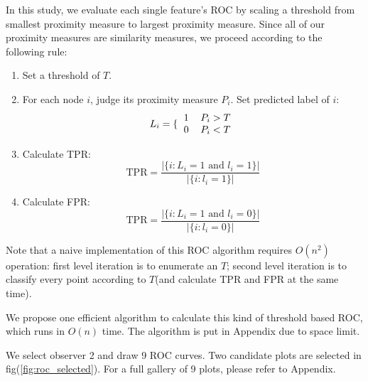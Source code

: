 \documentclass[11pt,a4paper]{article}
\begin{document}
In this study, we evaluate each single feature's ROC by scaling 
a threshold from smallest proximity measure to largest proximity 
measure. Since all of our proximity measures are similarity 
measures, we proceed according to the following rule:
\begin{enumerate}
	\item Set a threshold of $T$. 
	\item For each node $i$, judge its proximity measure $P_i$. 
	Set predicted label of $i$:
	\begin{equation}
		L_i = \lbrace{
			\begin{tabular}{cc}
				$1$ & $P_i > T$ \\
				$0$ & $P_i < T$ 
			\end{tabular}		
		}
	\end{equation}
	\item Calculate TPR:
	\begin{equation}
		\text{TPR} = \frac{|\{i:L_i=1 \text{ and } l_i=1\}|}{|\{i:l_i=1\}|}
	\end{equation}
	\item Calculate FPR:
	\begin{equation}
		\text{TPR} = \frac{|\{i:L_i=1 \text{ and } l_i=0\}|}{|\{i:l_i=0\}|}
	\end{equation}
\end{enumerate}

Note that a naive implementation of this ROC algorithm requires 
$O(n^2)$ operation: first level iteration is to enumerate an $T$;
second level iteration is to classify every point according to 
$T$(and calculate TPR and FPR at the same time).

We propose one efficient algorithm to calculate this kind of 
threshold based ROC, which runs in $O(n)$ time. The algorithm 
is put in Appendix due to space limit. 

We select observer 2 and draw 9 ROC curves. Two candidate 
plots are selected in fig(\ref{fig:roc_selected}). For a full 
gallery of 9 plots, please refer to Appendix. 
\end{document}
